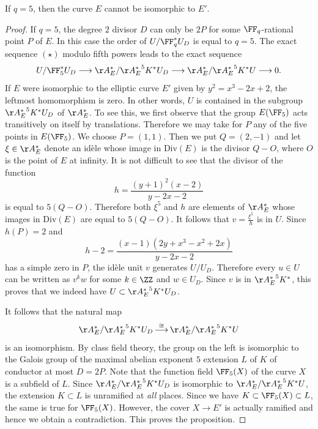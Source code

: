\begin{proposition}
If $q=5$, then the curve $E$ cannot be isomorphic to $E'$.
\end{proposition}

\begin{proof}
If $q=5$, the degree $2$ divisor $D$ can only be $2P$ for some
$\FF_q$-rational point $P$ of $E$. In this case the order of
$U/\FF_q^*U_D$ is equal to $q=5$. The exact sequence $(\star)$ modulo fifth powers
leads to the exact sequence
\[
U/\FF_5^*U_D
\longrightarrow
\AA_E^*/{\AA_E^*}^5K^*U_D
\longrightarrow
\AA_E^*/{\AA_E^*}^5K^*U
\longrightarrow 0.
\]
If $E$ were isomorphic to the elliptic curve $E'$ given by
$y^2=x^3-2x+2$, the leftmost homomorphism is zero. In other words, $U$ is
contained in the subgroup ${\AA_E^*}^5K^*U_D$ of $\AA_E^*$. To see this, we first observe that the group $E(\FF_5)$ acts transitively on
itself by translations. Therefore we may take for $P$ any of the five points in
$E(\FF_5)$. We choose $P=(1,1)$. Then we put $Q=(2,-1)$ and let
$\xi \in \AA_E^*$ denote an id\`ele whose image in $\mathrm{Div}(E)$ is the
divisor $Q-O$, where $O$ is the point of $E$ at infinity. It is not difficult to see that the divisor of the function
\[
h =
\frac{(y+1)^2(x-2)}{y-2x-2}
\]
is equal to $5(Q-O)$. Therefore both $\xi^5$ and $h$ are elements of
$\AA_E^*$ whose images in $\mathrm{Div}(E)$ are equal to $5(Q-O)$. It follows
that $v = \frac{\xi^5}{h}$ is in $U$. Since $h(P)=2$ and
\[
h-2 =
\frac{(x-1)(2y+x^3-x^2+2x)}{y-2x-2}
\]
has a simple zero in $P$, the id\`ele unit $v$ generates $U/U_D$. Therefore
every $u \in U$ can be written as $v^k w$ for some $k \in \ZZ$ and
$w \in U_D$. Since $v$ is in ${\AA_E^*}^5K^*$, this proves that we indeed have $U \subset {\AA_E^*}^5K^*U_D$.
 

It follows that the natural map
\[
\AA_E^*/{\AA_E^*}^5K^*U_D
\mathop{\longrightarrow}^{\cong}
\AA_E^*/{\AA_E^*}^5K^*U
\]
is an isomorphism. By class field theory, the group on the left is isomorphic
to the Galois group of the maximal abelian exponent $5$ extension $L$ of $K$ of
conductor at most $D=2P$. Note that the function field $\FF_5(X)$ of the curve
$X$ is a subfield of $L$. Since $\AA_E^*/{\AA_E^*}^5K^*U_D$ is isomorphic to  $\AA_E^*/{\AA_E^*}^5K^*U$,
 the extension $K \subset L$ is unramified at \textit{all} places. Since we have $K \subset \FF_5(X) \subset L$,
 the same is true for $\FF_5(X)$. However, the cover $X \rightarrow E'$ is
actually ramified and hence we obtain a contradiction.
This proves the proposition.
\end{proof}

